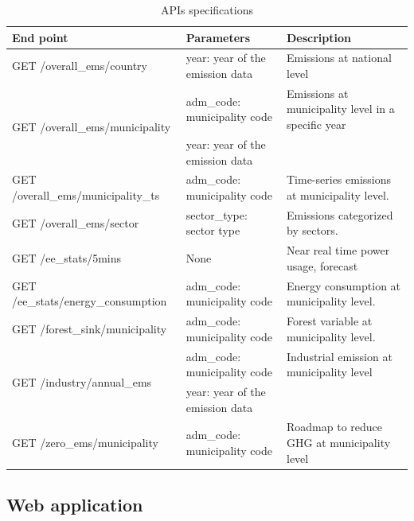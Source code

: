 \begin{table}[!ht]
  \centering
  \caption{APIs specifications}
  \begin{adjustbox}{width=\textwidth}
      \begin{tabular}{lll}
        \hline
        End point & Parameters & Description \\ \hline
        GET /overall\_ems/country  & year: year of the emission data  & Emissions at national level \\ \hline
        \multirow{2}{*}{GET /overall\_ems/municipality}  & adm\_code: municipality code  & Emissions at municipality level in a specific year \\ 
        ~ & year: year of the emission data  & ~ \\ \hline
        GET /overall\_ems/municipality\_ts  & adm\_code: municipality code  & Time-series emissions at municipality level.  \\ \hline
        GET /overall\_ems/sector  & sector\_type: sector type & Emissions categorized by sectors.  \\ \hline
        GET /ee\_stats/5mins  & None & Near real time power usage, forecast \\ \hline
        GET /ee\_stats/energy\_consumption  & adm\_code: municipality code  & Energy consumption at municipality level.  \\ \hline
        GET /forest\_sink/municipality  & adm\_code: municipality code  & Forest variable at municipality level.  \\ \hline
        \multirow{2}{*}{GET /industry/annual\_ems}  & adm\_code: municipality code & Industrial emission at municipality level \\ 
        ~ & year: year of the emission data & ~ \\ \hline
        GET /zero\_ems/municipality & adm\_code: municipality code & Roadmap to reduce GHG at municipality level \\ \hline
    \end{tabular}
  \end{adjustbox}
  \label{tab:chap7_tab2}
\end{table}

\subsection{Web application}

